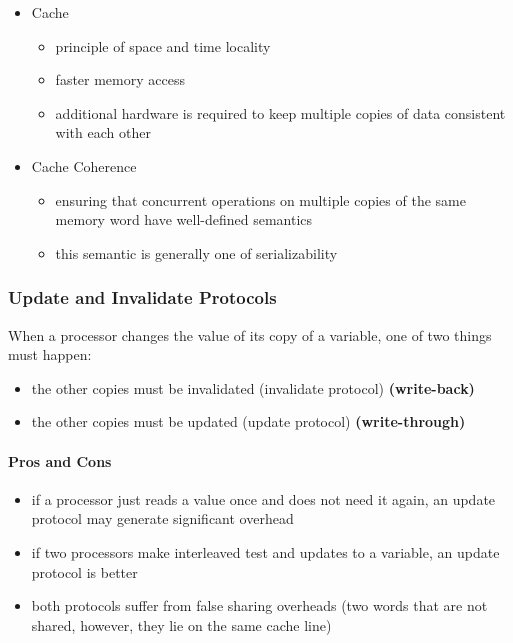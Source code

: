 \begin{itemize}
\tightlist
\item
  Cache

  \begin{itemize}
  \tightlist
  \item
    principle of space and time locality
  \item
    faster memory access
  \item
    additional hardware is required to keep multiple copies of data
    consistent with each other
  \end{itemize}
\item
  Cache Coherence

  \begin{itemize}
  \tightlist
  \item
    ensuring that concurrent operations on multiple copies of the same
    memory word have well-defined semantics
  \item
    this semantic is generally one of serializability
  \end{itemize}
\end{itemize}

\clearpage
\hypertarget{update-and-invalidate-protocols}{%
\subsubsection{Update and Invalidate
Protocols}\label{update-and-invalidate-protocols}}

When a processor changes the value of its copy of a variable, one of two
things must happen:

\begin{itemize}
\tightlist
\item
  the other copies must be invalidated (invalidate protocol)
  \textbf{(write-back)}
\item
  the other copies must be updated (update protocol)
  \textbf{(write-through)}
\end{itemize}

\hypertarget{pros-and-cons}{%
\paragraph{Pros and Cons}\label{pros-and-cons}}

\begin{itemize}
\tightlist
\item
  if a processor just reads a value once and does not need it again, an
  update protocol may generate significant overhead
\item
  if two processors make interleaved test and updates to a variable, an
  update protocol is better
\item
  both protocols suffer from false sharing overheads (two words that are
  not shared, however, they lie on the same cache line)
\end{itemize}

